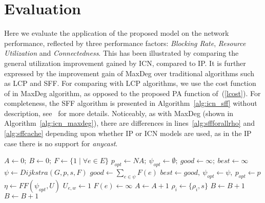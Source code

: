 \documentclass[journal]{IEEEtran}
\begin{document}
\section{Evaluation}\label{sec:eva}
Here we evaluate the application of the proposed model on the network performance, reflected by three performance factors: \emph{Blocking Rate}, \emph{Resource Utilization} and \emph{Connectedness}. This has been illustrated by comparing the general utilization improvement gained by ICN, compared to IP. It is further expressed by the improvement gain of MaxDeg over traditional algorithms such as LCP and SFF. For comparing with LCP algorithms, we use the cost function of \cite{ozd:rwa} in MaxDeg algorithm, as opposed to the proposed PA function of~(\ref{lcost}).
For completeness, the SFF algorithm is presented in
Algorithm~\ref{alg:icn_sff} without description, see~\cite{dij:rwa}
for more details. Noticeably, as with MaxDeg (shown in
Algorithm~\ref{alg:icn_maxdeg}), there are differences in
lines~\ref{alg:sffforallrho} and \ref{alg:sffcache} depending upon
whether IP or ICN models are used, as in the IP case there is no support for
\emph{anycast}.
\begin{algorithm}[t]
\caption{$ICN:SFF(G(V,E,W), \Delta)$}
\label{alg:icn_sff}
\begin{algorithmic}[1]
\STATE $A \leftarrow 0; \ B \leftarrow 0;\ F \leftarrow \{1 \mid \forall e \in E \}$
			\STATE $p_{opt} \leftarrow NA; \ \psi_{opt} \leftarrow \emptyset; \ good \leftarrow \infty;\ best \leftarrow \infty$
             \label{alg:sffforallrho}
				\STATE$\psi \leftarrow Dijkstra(G,p,s,F)$
				\STATE$good \leftarrow \sum_{e \in \psi} F(e)$
					\STATE$ best \leftarrow good, \ \psi_{opt}\leftarrow \psi, \ p_{opt} \leftarrow p$
				\ENDIF
			\ENDFOR
				\STATE $\eta \leftarrow FF(\psi_{opt}, U)$
				\IF{$\eta \neq \emptyset $}
					\FORALL {$[e,w] \in \eta$}
						\STATE $U_{e,w} \leftarrow 1$
							\STATE$F(e) \leftarrow \infty$
						\ENDIF
					\ENDFOR
					\STATE$A \leftarrow A + 1$
          \STATE {} 
					{
					 $\rho_i \leftarrow \{\rho_i, s\}$
					} \label{alg:sffcache}
				\ELSE
					\STATE$B \leftarrow B+ 1$
				\ENDIF
			\ELSE
				\STATE$B \leftarrow B + 1$
			\ENDIF
		\ENDFOR
	\ENDFOR
\end{algorithmic}
\end{algorithm}
\end{document}
